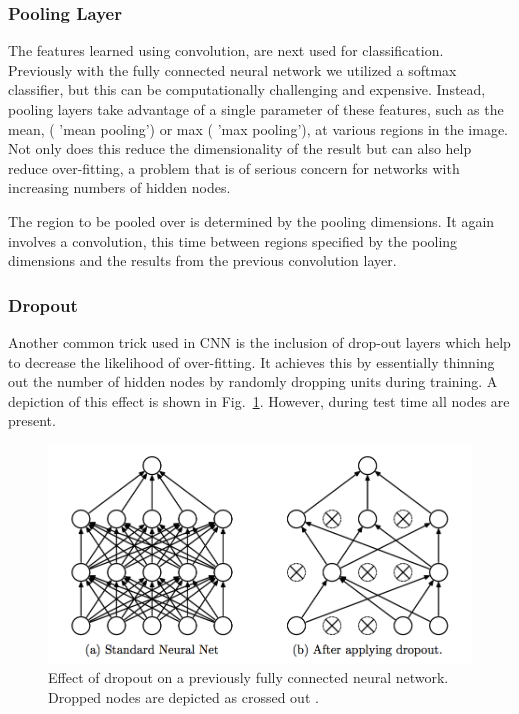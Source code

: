 \documentclass[12pt, twocolumn]{article}
\begin{document}
\subsubsection{Pooling Layer}
The features learned using convolution, are next used for classification. Previously with the fully connected neural network we utilized a softmax classifier, but this can be computationally challenging and expensive. Instead, pooling layers take advantage of a single parameter of these features, such as the mean, ( 'mean pooling') or max ( 'max pooling'), at  various regions in the image. Not only does this reduce the dimensionality of the result but can also help reduce over-fitting, a problem that is of serious concern for networks with increasing numbers of hidden nodes. 

The region to be pooled over is determined by the pooling dimensions. It again involves a convolution, this time between regions specified by the pooling dimensions and the results from the previous convolution layer. 

\subsubsection{Dropout}

Another common trick used in CNN is the inclusion of drop-out layers which help to decrease the likelihood of over-fitting. It achieves this by essentially thinning out the number of hidden nodes by randomly dropping units during training.  A depiction of this effect is shown in Fig.~\ref{fig:dropout}. However, during test time all nodes are present. 
\begin{figure}
\includegraphics[scale=.52]{dropout.png}

\caption{Effect of dropout on a previously fully connected neural network. Dropped nodes are depicted as crossed out \cite{Dropout}. }
\label{fig:dropout}
\end{figure}
\end{document}
